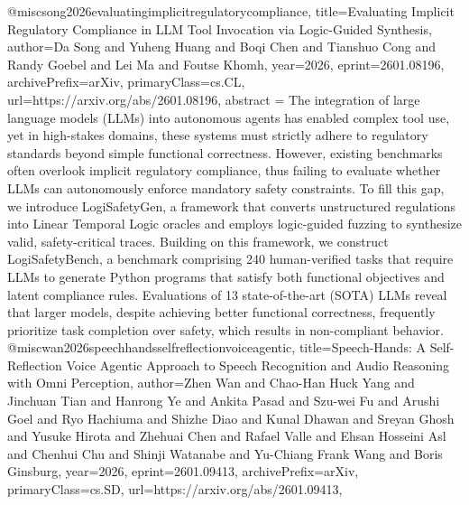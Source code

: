 {}@misc{song2026evaluatingimplicitregulatorycompliance,
      title={Evaluating Implicit Regulatory Compliance in LLM Tool Invocation via Logic-Guided Synthesis}, 
      author={Da Song and Yuheng Huang and Boqi Chen and Tianshuo Cong and Randy Goebel and Lei Ma and Foutse Khomh},
      year={2026},
      eprint={2601.08196},
      archivePrefix={arXiv},
      primaryClass={cs.CL},
      url={https://arxiv.org/abs/2601.08196},
      abstract = {The integration of large language models (LLMs) into autonomous agents has enabled complex tool use, yet in high-stakes domains, these systems must strictly adhere to regulatory standards beyond simple functional correctness. However, existing benchmarks often overlook implicit regulatory compliance, thus failing to evaluate whether LLMs can autonomously enforce mandatory safety constraints. To fill this gap, we introduce LogiSafetyGen, a framework that converts unstructured regulations into Linear Temporal Logic oracles and employs logic-guided fuzzing to synthesize valid, safety-critical traces. Building on this framework, we construct LogiSafetyBench, a benchmark comprising 240 human-verified tasks that require LLMs to generate Python programs that satisfy both functional objectives and latent compliance rules. Evaluations of 13 state-of-the-art (SOTA) LLMs reveal that larger models, despite achieving better functional correctness, frequently prioritize task completion over safety, which results in non-compliant behavior.}
}@misc{wan2026speechhandsselfreflectionvoiceagentic,
      title={Speech-Hands: A Self-Reflection Voice Agentic Approach to Speech Recognition and Audio Reasoning with Omni Perception}, 
      author={Zhen Wan and Chao-Han Huck Yang and Jinchuan Tian and Hanrong Ye and Ankita Pasad and Szu-wei Fu and Arushi Goel and Ryo Hachiuma and Shizhe Diao and Kunal Dhawan and Sreyan Ghosh and Yusuke Hirota and Zhehuai Chen and Rafael Valle and Ehsan Hosseini Asl and Chenhui Chu and Shinji Watanabe and Yu-Chiang Frank Wang and Boris Ginsburg},
      year={2026},
      eprint={2601.09413},
      archivePrefix={arXiv},
      primaryClass={cs.SD},
      url={https://arxiv.org/abs/2601.09413},
}
